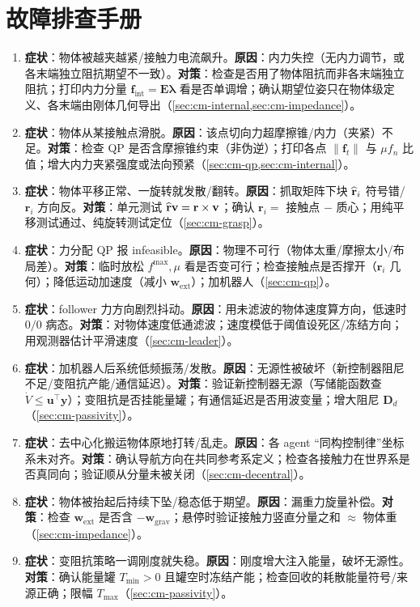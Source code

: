 \section*{故障排查手册}
\begin{enumerate}
  \item \textbf{症状}：物体被越夹越紧/接触力电流飙升。\textbf{原因}：内力失控（无内力调节，或各末端独立阻抗期望不一致）。\textbf{对策}：检查是否用了物体阻抗而非各末端独立阻抗；打印内力分量 $\mathbf{f}_{\text{int}}=\mathbf{E}\boldsymbol{\lambda}$ 看是否单调增；确认期望位姿只在物体级定义、各末端由刚体几何导出（\cref{sec:cm-internal,sec:cm-impedance}）。
  \item \textbf{症状}：物体从某接触点滑脱。\textbf{原因}：该点切向力超摩擦锥/内力（夹紧）不足。\textbf{对策}：检查 QP 是否含摩擦锥约束（非伪逆）；打印各点 $\|\mathbf{f}_t\|$ 与 $\mu f_n$ 比值；增大内力夹紧强度或法向预紧（\cref{sec:cm-qp,sec:cm-internal}）。
  \item \textbf{症状}：物体平移正常、一旋转就发散/翻转。\textbf{原因}：抓取矩阵下块 $\widehat{\mathbf{r}}_i$ 符号错/$\mathbf{r}_i$ 方向反。\textbf{对策}：单元测试 $\widehat{\mathbf{r}}\mathbf{v}=\mathbf{r}\times\mathbf{v}$；确认 $\mathbf{r}_i=$ 接触点 $-$ 质心；用纯平移测试通过、纯旋转测试定位（\cref{sec:cm-grasp}）。
  \item \textbf{症状}：力分配 QP 报 infeasible。\textbf{原因}：物理不可行（物体太重/摩擦太小/布局差）。\textbf{对策}：临时放松 $f^{\max},\mu$ 看是否变可行；检查接触点是否撑开（$\mathbf{r}_i$ 几何）；降低运动加速度（减小 $\mathbf{w}_{\text{ext}}$）；加机器人（\cref{sec:cm-qp}）。
  \item \textbf{症状}：follower 力方向剧烈抖动。\textbf{原因}：用未滤波的物体速度算方向，低速时 $0/0$ 病态。\textbf{对策}：对物体速度低通滤波；速度模低于阈值设死区/冻结方向；用观测器估计平滑速度（\cref{sec:cm-leader}）。
  \item \textbf{症状}：加机器人后系统低频振荡/发散。\textbf{原因}：无源性被破坏（新控制器阻尼不足/变阻抗产能/通信延迟）。\textbf{对策}：验证新控制器无源（写储能函数查 $\dot V\le\mathbf{u}^\top\mathbf{y}$）；变阻抗是否挂能量罐；有通信延迟是否用波变量；增大阻尼 $\mathbf{D}_d$（\cref{sec:cm-passivity}）。
  \item \textbf{症状}：去中心化搬运物体原地打转/乱走。\textbf{原因}：各 agent “同构控制律”坐标系未对齐。\textbf{对策}：确认导航方向在共同参考系定义；检查各接触力在世界系是否真同向；验证顺从分量未被关闭（\cref{sec:cm-decentral}）。
  \item \textbf{症状}：物体被抬起后持续下坠/稳态低于期望。\textbf{原因}：漏重力旋量补偿。\textbf{对策}：检查 $\mathbf{w}_{\text{ext}}$ 是否含 $-\mathbf{w}_{\text{grav}}$；悬停时验证接触力竖直分量之和 $\approx$ 物体重（\cref{sec:cm-impedance}）。
  \item \textbf{症状}：变阻抗策略一调刚度就失稳。\textbf{原因}：刚度增大注入能量，破坏无源性。\textbf{对策}：确认能量罐 $T_{\min}>0$ 且罐空时冻结产能；检查回收的耗散能量符号/来源正确；限幅 $T_{\max}$（\cref{sec:cm-passivity}）。
\end{enumerate}
